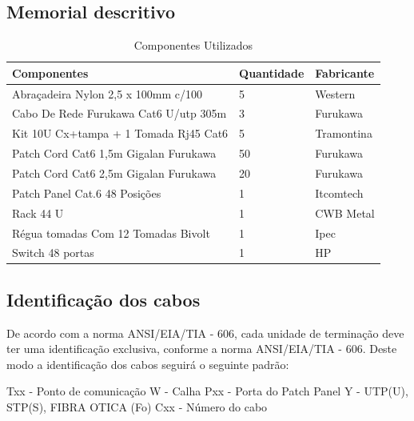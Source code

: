 \documentclass[	DIV=calc,%
paper=a4,%
fontsize=12pt,%
onecolumn]{scrartcl}	 					%
\begin{document}
	\clearpage
	\recalctypearea
	\subsection{Memorial descritivo}
	
\begin{table}[h!]
	\centering
	\caption{Componentes Utilizados}
	\label{tab2} %
	\begin{tabular}{|l|l|l|}
		\hline
		Componentes                                   & Quantidade & Fabricante      \\ \hline
		Abraçadeira Nylon 2,5 x 100mm c/100			       & 5          & Western         \\ \hline
		Cabo De Rede Furukawa Cat6 U/utp 305m     		   & 3          & Furukawa        \\ \hline
		Kit 10U Cx+tampa + 1 Tomada Rj45 Cat6              & 5          & Tramontina      \\ \hline
		Patch Cord Cat6 1,5m Gigalan Furukawa              & 50         & Furukawa        \\ \hline
		Patch Cord Cat6 2,5m Gigalan Furukawa              & 20         & Furukawa        \\ \hline
		Patch Panel Cat.6 48 Posições                      & 1          & Itcomtech        \\ \hline
		Rack 44 U                                          & 1          & CWB Metal		  \\ \hline
		Régua tomadas Com 12 Tomadas Bivolt 			   & 1          & Ipec            \\ \hline
		Switch 48 portas                                   & 1          & HP              \\ \hline
	\end{tabular}
\end{table}
	
	\subsection{Identificação dos cabos}

	De acordo com a norma ANSI/EIA/TIA - 606, cada unidade de terminação deve ter uma identificação exclusiva, conforme a norma ANSI/EIA/TIA - 606. Deste modo a identificação dos cabos seguirá o seguinte padrão:
	
	\subitem Txx - Ponto de comunicação
	\subitem W - Calha
	\subitem Pxx - Porta do Patch Panel
	\subitem Y - UTP(U), STP(S), FIBRA OTICA (Fo)
	\subitem Cxx - Número do cabo
	
\end{document}
